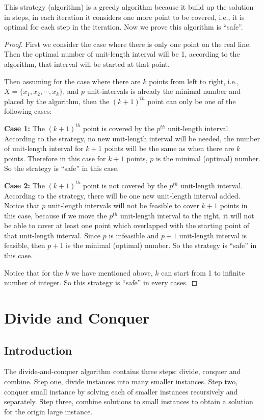 					This strategy (algorithm) is a greedy algorithm because it build up the solution in steps, in each iteration it considers one more point to be covered, i.e., it is optimal for each step in the iteration. Now we prove this algorithm is ``safe''.

					\begin{proof}
						First we consider the case where there is only one point on the real line. Then the optimal number of unit-length interval will be 1, according to the algorithm, that interval will be started at that point.

						Then assuming for the case where there are $k$ points from left to right, i.e., $X = \{x_1, x_2, \cdots, x_k\}$, and $p$ unit-intervals is already the minimal number and placed by the algorithm, then the $(k+1)^{th}$ point can only be one of the following cases:

						\textbf{Case 1:} The $(k+1)^{th}$ point is covered by the $p^{th}$ unit-length interval. According to the strategy, no new unit-length interval will be needed, the number of unit-length interval for $k+1$ points will be the same as when there are $k$ points. Therefore in this case for $k+1$ points, $p$ is the minimal (optimal) number. So the strategy is ``safe'' in this case.

						\textbf{Case 2:} The $(k+1)^{th}$ point is not covered by the $p^{th}$ unit-length interval. According to the strategy, there will be one new unit-length interval added. Notice that $p$ unit-length intervals will not be feasible to cover $k+1$ points in this case, because if we move the $p^{th}$ unit-length interval to the right, it will not be able to cover at least one point which overlapped with the starting point of that unit-length interval. Since $p$ is infeasible and $p+1$ unit-length interval is feasible, then $p+1$ is the minimal (optimal) number. So the strategy is ``safe'' in this case.

						Notice that for the $k$ we have mentioned above, $k$ can start from 1 to infinite number of integer. So this strategy is ``safe'' in every cases.
					\end{proof}

		\section{Divide and Conquer}
			\subsection{Introduction}
				The divide-and-conquer algorithm contains three steps: divide, conquer and combine. Step one, divide instances into many smaller instances. Step two, conquer small instance by solving each of smaller instances recursively and separately. Step three, combine solutions to small instances to obtain a solution for the origin large instance.

